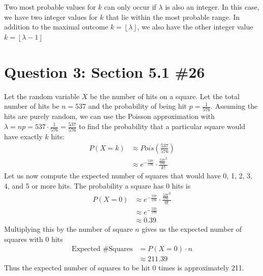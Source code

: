 \documentclass[11pt, oneside]{article}   	%
\begin{document}
Two most probable values for $k$ can only occur if $\lambda$ is also an integer. In this case, we have two integer values for $k$ that lie within the most probable range. In addition to the maximal outcome $k = \left \lfloor{\lambda}\right \rfloor$, we also have the other integer value $k = \left \lfloor{\lambda -1}\right \rfloor$



\section*{Question 3: Section 5.1 \#26}

Let the random variable $X$ be the number of hits on a square. Let the total number of hits be $n=537$ and the probability of being hit $p=\frac{1}{576}$. Assuming the hits are purely random, we can use the Poisson approximation with $\lambda = np = 537 \cdot \frac{1}{576} = \frac{537}{576}$ to find the probability that a particular square would have exactly $k$ hits:
\begin{align*}
	P(X=k) & \approx Pois(\frac{537}{576}) \\
	& \approx e^{-\frac{537}{576}} \cdot \frac{\frac{537}{576}^k}{k!}
\end{align*}
Let us now compute the expected number of squares that would have 0, 1, 2, 3, 4, and 5 or more hits. The probability a square has 0 hits is
\begin{align*}
	P(X=0) & \approx e^{-\frac{537}{576}} \cdot \frac{\frac{537}{576}^0}{0!} \\
	& \approx  e^{-\frac{537}{576}} \\
	& \approx 0.39
\end{align*}
Multiplying this by the number of square $n$ gives us the expected number of squares with 0 hits
\begin{align*}
	\text{Expected \# Squares} & = P(X=0) \cdot n \\
	& \approx 211.39
\end{align*}
Thus the expected number of squares to be hit 0 times is approximately 211. 
\end{document}
